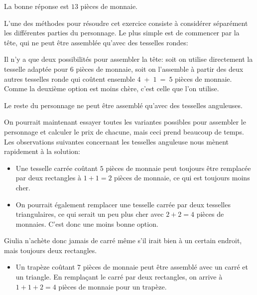\documentclass[a4paper,11pt]{report}
\newcommand{\taskGraphicsFolder}{..}
\begin{document}
La bonne réponse est $13$ pièces de monnaie.

L’une des méthodes pour résoudre cet exercice consiste à considérer séparément les différentes parties du personnage. Le plus simple est de commencer par la tête, qui ne peut être assemblée qu’avec des tesselles rondes:

{\centering%
\par}

Il n’y a que deux possibilités pour assembler la tête: soit on utilise directement la tesselle adaptée pour $6$ pièces de monnaie, soit on l’assemble à partir des deux autres tesselles ronde qui coûtent ensemble $4$~+~$1$~=~$5$ pièces de monnaie. Comme la deuxième option est moins chère, c’est celle que l’on utilise.

Le reste du personnage ne peut être assemblé qu’avec des tesselles anguleuses.

{\centering%
\par}

On pourrait maintenant essayer toutes les variantes possibles pour assembler le personnage et calculer le prix de chacune, mais ceci prend beaucoup de temps. Les observations suivantes concernant les tesselles anguleuse nous mènent rapidement à la solution:

{\centering%
\par}

\begin{itemize}
  \item Une tesselle carrée coûtant $5$ pièces de monnaie peut toujours être remplacée par deux rectangles à ${1 + 1 = 2}$ pièces de monnaie, ce qui est toujours moins cher.
  \item On pourrait également remplacer une tesselle carrée par deux tesselles triangulaires, ce qui serait un peu plus cher avec ${2 + 2 = 4}$ pièces de monnaies. C’est donc une moins bonne option.
\end{itemize}

Giulia n’achète donc jamais de carré même s’il irait bien à un certain endroit, mais toujours deux rectangles.

\begin{itemize}
  \item Un trapèze coûtant $7$ pièces de monnaie peut être assemblé avec un carré et un triangle. En remplaçant le carré par deux rectangles, on arrive à ${1 + 1 + 2 = 4}$ pièces de monnaie pour un trapèze.
\end{itemize}
\end{document}
